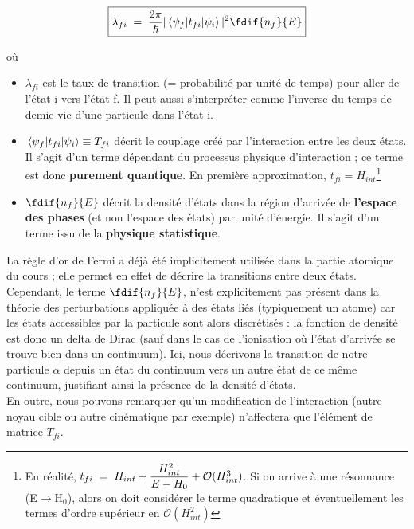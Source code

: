 \begin{minipage}{.3\textwidth}
  \vspace{-6.1cm}
  \begin{equation*}
  \boxed{
    \lambda_{fi} \eq
    \dfrac{2\pi}{\hbar }|\mel{\psi_f}{t_{fi}}{\psi_i}|^2 \fdif{n_f}{E}
    \label{fermi}
   }
   \end{equation*}
\end{minipage} 
\begin{minipage}[t]{.035\textwidth}
  \vspace{-3.3cm}
  où
\end{minipage}
\begin{minipage}{.59\textwidth}
  \begin{itemize}[label=$\bullet$]
      \item $\lambda_{fi}$ est le taux de transition (= probabilité par unité de temps) pour aller de l'état i vers l'état f. Il peut aussi s'interpréter comme l'inverse du temps de demie-vie d'une particule dans l'état i.
      \item $\mel{\psi_f}{t_{fi}}{\psi_i} \equiv T_{fi}$ décrit le couplage créé par l'interaction entre les deux états. Il s'agit d'un terme dépendant du processus physique d'interaction ; ce terme est donc \textbf{purement quantique}. En première approximation, $t_{fi} = H_{int}$\footnote{En réalité, $t_{fi} \; = \; H_{int} + \dfrac{H_{int}^2}{E-H_0} + \mathcal{O}(H_{int}^3) $. Si on arrive à une résonnance (E$\rightarrow$H$_0$), alors on doit considérer le terme quadratique et éventuellement les termes d'ordre supérieur en $\mathcal{O}(H_{int}^2)$ }
      \item $\fdif{n_f}{E}$ décrit la densité d'états dans la région d'arrivée de \textbf{l'espace des phases} (et non l'espace des états) par unité d'énergie. Il s'agit d'un terme issu de la \textbf{physique statistique}.
  \end{itemize}
\end{minipage}
\vspace{0.2cm}

La règle d'or de Fermi a déjà été implicitement utilisée dans la partie atomique du cours ; elle permet en effet de décrire la transitions entre deux états. Cependant, le terme $\fdif{n_f}{E}$, n'est explicitement pas présent dans la théorie des perturbations appliquée à des états liés (typiquement un atome) car les états accessibles par la particule sont alors discrétisés : la fonction de densité est donc un delta de Dirac (sauf dans le cas de l'ionisation où l'état d'arrivée se trouve bien dans un continuum). Ici, nous décrivons la transition de notre particule $\alpha$ depuis un état du continuum vers un autre état de ce même continuum, justifiant ainsi la présence de la densité d'états.\\
En outre, nous pouvons remarquer qu'un modification de l'interaction (autre noyau cible ou autre cinématique par exemple) n'affectera que l'élément de matrice $T_{fi}$.\\

